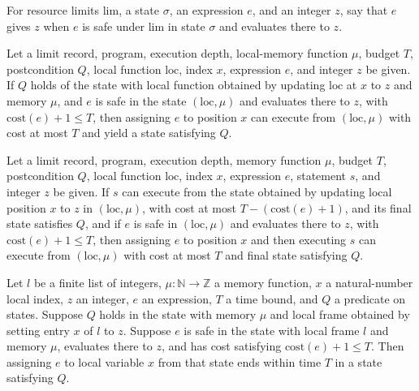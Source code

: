 \begin{definition}
\label{Light.Expr.Gives}
\leanok
{}
For resource limits $\text{lim}$, a state $\sigma$, an expression $e$, and an integer
$z$, say that $e$ gives $z$ when $e$ is safe under $\text{lim}$ in state $\sigma$ and
evaluates there to $z$.
\end{definition}

\begin{theorem}
\label{Light.Ends.setVal}
\leanok
{}
Let a limit record, program, execution depth, local-memory function $\mu$, budget $T$,
postcondition $Q$, local function $\mathrm{loc}$, index $x$, expression $e$, and integer
$z$ be given. If $Q$ holds of the state with local function obtained by updating
$\mathrm{loc}$ at $x$ to $z$ and memory $\mu$, and $e$ is safe in the state
$(\mathrm{loc},\mu)$ and evaluates there to $z$, with $\mathrm{cost}(e)+1\le T$, then
assigning $e$ to position $x$ can execute from $(\mathrm{loc},\mu)$ with cost at most
$T$ and yield a state satisfying $Q$.
\end{theorem}

\begin{theorem}
\label{Light.Ends.setValThen}
\leanok
{}
Let a limit record, program, execution depth, memory function $\mu$, budget $T$,
postcondition $Q$, local function $\mathrm{loc}$, index $x$, expression $e$, statement
$s$, and integer $z$ be given. If $s$ can execute from the state obtained by updating
local position $x$ to $z$ in $(\mathrm{loc},\mu)$, with cost at most
$T-(\mathrm{cost}(e)+1)$, and its final state satisfies $Q$, and if $e$ is safe in
$(\mathrm{loc},\mu)$ and evaluates there to $z$, with $\mathrm{cost}(e)+1\le T$, then
assigning $e$ to position $x$ and then executing $s$ can execute from
$(\mathrm{loc},\mu)$ with cost at most $T$ and final state satisfying $Q$.
\end{theorem}

\begin{theorem}
\label{Light.Ends.setTo}
\leanok
{}
Let $l$ be a finite list of integers, $\mu:\mathbb{N}\to\mathbb{Z}$ a memory function,
$x$ a natural-number local index, $z$ an integer, $e$ an expression, $T$ a time bound,
and $Q$ a predicate on states. Suppose $Q$ holds in the state with memory $\mu$ and
local frame obtained by setting entry $x$ of $l$ to $z$. Suppose $e$ is safe in the state
with local frame $l$ and memory $\mu$, evaluates there to $z$, and has cost satisfying
$\mathrm{cost}(e)+1\le T$. Then assigning $e$ to local variable $x$ from that state
ends within time $T$ in a state satisfying $Q$.
\end{theorem}

